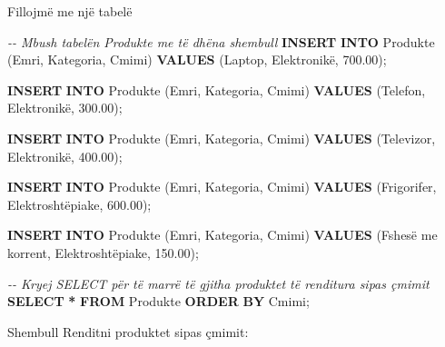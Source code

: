 \documentclass[
  ignorenonframetext,
]{beamer}
\newenvironment{Shaded}{\begin{snugshade}}{\end{snugshade}}
\newcommand{\CommentTok}[1]{\textcolor[rgb]{0.56,0.35,0.01}{\textit{#1}}}
\newcommand{\FloatTok}[1]{\textcolor[rgb]{0.00,0.00,0.81}{#1}}
\newcommand{\KeywordTok}[1]{\textcolor[rgb]{0.13,0.29,0.53}{\textbf{#1}}}
\newcommand{\NormalTok}[1]{#1}
\newcommand{\OperatorTok}[1]{\textcolor[rgb]{0.81,0.36,0.00}{\textbf{#1}}}
\newcommand{\StringTok}[1]{\textcolor[rgb]{0.31,0.60,0.02}{#1}}
\begin{document}
\begin{frame}[fragile]{Fillojmë me një tabelë}
\label{fillojmuxeb-me-njuxeb-tabeluxeb-3}

\begin{Shaded}
\begin{Highlighting}[]
\CommentTok{{-}{-} Mbush tabelën Produkte me të dhëna shembull}
\KeywordTok{INSERT} \KeywordTok{INTO}\NormalTok{ Produkte (Emri, Kategoria, Cmimi)}
\KeywordTok{VALUES}\NormalTok{ (}\StringTok{\textquotesingle{}Laptop\textquotesingle{}}\NormalTok{, }\StringTok{\textquotesingle{}Elektronikë\textquotesingle{}}\NormalTok{, }\FloatTok{700.00}\NormalTok{);}

\KeywordTok{INSERT} \KeywordTok{INTO}\NormalTok{ Produkte (Emri, Kategoria, Cmimi)}
\KeywordTok{VALUES}\NormalTok{ (}\StringTok{\textquotesingle{}Telefon\textquotesingle{}}\NormalTok{, }\StringTok{\textquotesingle{}Elektronikë\textquotesingle{}}\NormalTok{, }\FloatTok{300.00}\NormalTok{);}

\KeywordTok{INSERT} \KeywordTok{INTO}\NormalTok{ Produkte (Emri, Kategoria, Cmimi)}
\KeywordTok{VALUES}\NormalTok{ (}\StringTok{\textquotesingle{}Televizor\textquotesingle{}}\NormalTok{, }\StringTok{\textquotesingle{}Elektronikë\textquotesingle{}}\NormalTok{, }\FloatTok{400.00}\NormalTok{);}

\KeywordTok{INSERT} \KeywordTok{INTO}\NormalTok{ Produkte (Emri, Kategoria, Cmimi)}
\KeywordTok{VALUES}\NormalTok{ (}\StringTok{\textquotesingle{}Frigorifer\textquotesingle{}}\NormalTok{, }\StringTok{\textquotesingle{}Elektroshtëpiake\textquotesingle{}}\NormalTok{, }\FloatTok{600.00}\NormalTok{);}

\KeywordTok{INSERT} \KeywordTok{INTO}\NormalTok{ Produkte (Emri, Kategoria, Cmimi)}
\KeywordTok{VALUES}\NormalTok{ (}\StringTok{\textquotesingle{}Fshesë me korrent\textquotesingle{}}\NormalTok{, }\StringTok{\textquotesingle{}Elektroshtëpiake\textquotesingle{}}\NormalTok{, }\FloatTok{150.00}\NormalTok{);}

\CommentTok{{-}{-} Kryej SELECT për të marrë të gjitha produktet të renditura sipas çmimit}
\KeywordTok{SELECT} \OperatorTok{*} \KeywordTok{FROM}\NormalTok{ Produkte}
\KeywordTok{ORDER} \KeywordTok{BY}\NormalTok{ Cmimi;}
\end{Highlighting}
\end{Shaded}
\end{frame}

\begin{frame}{Shembull}
\label{shembull-8}
Renditni produktet sipas çmimit:
\end{frame}
\end{document}

